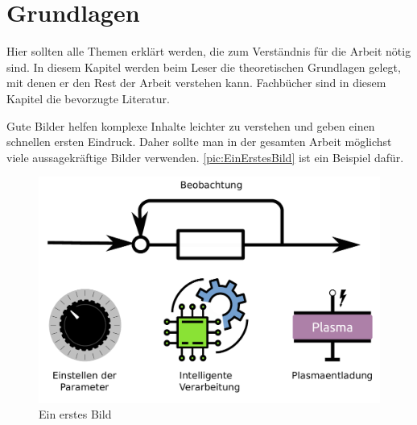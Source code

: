 

\clearpage

\section{Grundlagen}

Hier sollten alle Themen erklärt werden, die zum Verständnis für die Arbeit nötig sind. In diesem Kapitel werden beim Leser die theoretischen Grundlagen gelegt, mit denen er den Rest der Arbeit verstehen kann. Fachbücher \citep{Helmke2016,Metelmann2016} sind in diesem Kapitel die bevorzugte Literatur. 

Gute Bilder helfen komplexe Inhalte leichter zu verstehen und geben einen schnellen ersten Eindruck. Daher sollte man in der gesamten Arbeit möglichst viele aussagekräftige Bilder verwenden. \autoref{pic:EinErstesBild} ist ein Beispiel dafür.

\begin{figure}[htbp]
	\centering
	\includegraphics[width=0.5\linewidth]{pic/IntelligentesPlasma.pdf}
	\caption{Ein erstes Bild}
	\label{pic:EinErstesBild}
\end{figure}
